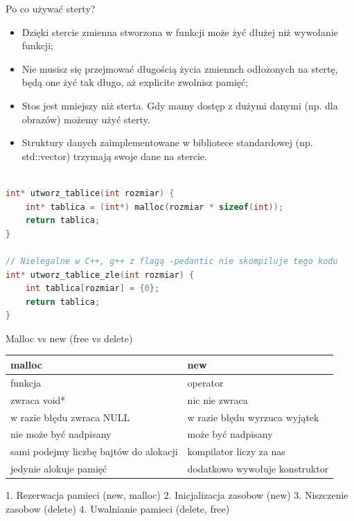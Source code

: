 \documentclass[notheorems, aspectratio=54]{beamer}
\begin{document}
\begin{frame}
	Po co używać sterty?
	
	\begin {itemize}
	\item Dzięki stercie zmienna stworzona w funkcji może żyć dłużej niż wywołanie funkcji;
	\item Nie musisz się przejmować długością życia zmiennch odłożonych na stertę, będą one żyć tak długo, aż explicite zwolnisz pamięć;
	\item Stos jest mniejszy niż sterta. Gdy mamy dostęp z dużymi danymi (np. dla obrazów) możemy użyć sterty.
	\item Struktury danych zaimplementowane w bibliotece standardowej (np. std::vector) trzymają swoje dane na stercie.
	\end {itemize}
	
	\begin{lstlisting}[language=C++]

int* utworz_tablice(int rozmiar) {
    int* tablica = (int*) malloc(rozmiar * sizeof(int));
    return tablica;
}

// Nielegalne w C++, g++ z flagą -pedantic nie skompiluje tego kodu
int* utworz_tablice_zle(int rozmiar) {
    int tablica[rozmiar] = {0};
    return tablica;
}

	\end{lstlisting}
	
\end{frame}

\begin{frame}
	Malloc vs new (free vs delete)
	
	\begin{table}[]
		\begin{tabular}{| l | l | }
			\hline
			malloc                                   & new                              \\
			\hline
			funkcja                                  & operator                         \\
			zwraca void*                             & nic nie zwraca                   \\
			w razie błędu zwraca NULL              & w razie błędu wyrzuca wyjątek \\
			nie może być nadpisany                 & może być nadpisany             \\
			sami podejmy liczbę bajtów do alokacji & kompilator liczy za nas          \\
			jedynie alokuje pamięć                 & dodatkowo wywołuje konstruktor  \\
		\end{tabular}
	\end{table}
	
	1. Rezerwacja pamieci (new, malloc)
	2. Inicjalizacja zasobow (new)
	3. Niszczenie zasobow (delete)
	4. Uwalnianie pamieci (delete, free)
	
\end{frame}
\end{document}

